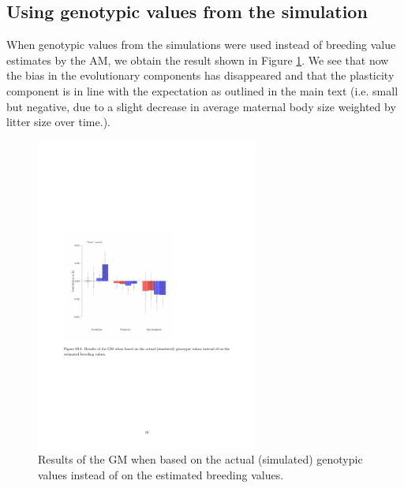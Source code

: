 \subsection{Using genotypic values from the simulation}\label{app:elln:bvs}
When genotypic values from the simulations were used instead of breeding value estimates by the AM, we obtain the result shown in Figure \ref{fig:gpeGV}. We see that now the bias in the evolutionary components has disappeared and that the plasticity component is in line with the expectation as outlined in the main text (i.e. small but negative, due to a slight decrease in average maternal body size weighted by litter size over time.).
\begin{figure}[b]
\centering
\includegraphics[width=0.65\textwidth]{Appendices/FigS4}
\caption{\footnotesize Results of the GM when based on the actual (simulated) genotypic values instead of on the estimated breeding values.}
\label{fig:gpeGV}
\end{figure}
